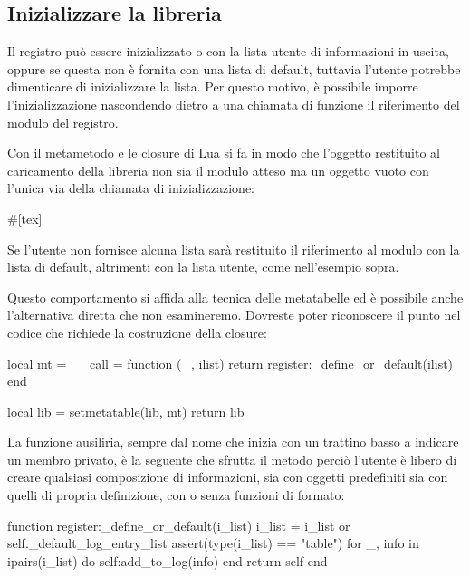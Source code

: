 \subsection{Inizializzare la libreria}

Il registro può essere inizializzato o con la lista utente di informazioni in
uscita, oppure se questa non è fornita con una lista di default, tuttavia
l'utente potrebbe dimenticare di inizializzare la lista. Per questo motivo, è
possibile imporre l'inizializzazione nascondendo dietro a una chiamata di
funzione il riferimento del modulo del registro.

Con il metametodo  e le closure di Lua si fa in modo che l'oggetto
restituito al caricamento della libreria non sia il modulo atteso 
ma un oggetto vuoto con l'unica via della chiamata di inizializzazione:
\begin{lines}
#[tex]
\end{lines}

Se l'utente non fornisce alcuna lista sarà restituito il riferimento al modulo
con la lista di default, altrimenti con la lista utente, come nell'esempio
sopra.

Questo comportamento si affida alla tecnica delle metatabelle ed è possibile
anche l'alternativa diretta che non esamineremo. Dovreste poter riconoscere il
punto nel codice che richiede la costruzione della closure:
\begin{lines}
local mt = {
    __call = function (_, ilist)
        return register:_define_or_default(ilist)
    end
}

local lib = {}
setmetatable(lib, mt)
return lib
\end{lines}

La funzione ausiliria, sempre dal nome che inizia con un trattino basso a
indicare un membro privato, è la seguente che sfrutta il metodo
 perciò l'utente è libero di creare qualsiasi composizione di
informazioni, sia con oggetti  predefiniti sia con quelli di propria
definizione, con o senza funzioni di formato:
\begin{lines}
function register:_define_or_default(i_list)
    i_list = i_list or self._default_log_entry_list
    assert(type(i_list) == "table")
    for _, info in ipairs(i_list) do
        self:add_to_log(info)
    end
    return self
end
\end{lines}


